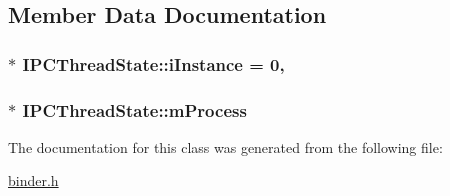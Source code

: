 \subsection{Member Data Documentation}
\hypertarget{classIPCThreadState_a54fefc86880e0e140d40e9aa7247cc47}{
\subsubsection[{i\-Instance}]{ $\ast$ I\-P\-C\-Thread\-State\-::i\-Instance = 0\hspace{0.3cm}{\ttfamily [static]}, {\ttfamily [private]}}}\label{classIPCThreadState_a54fefc86880e0e140d40e9aa7247cc47}
\hypertarget{classIPCThreadState_aefae3c0f96244ce87f9289defee13b54}{
\subsubsection[{m\-Process}]{$\ast$ I\-P\-C\-Thread\-State\-::m\-Process\hspace{0.3cm}{\ttfamily [private]}}}\label{classIPCThreadState_aefae3c0f96244ce87f9289defee13b54}


The documentation for this class was generated from the following file\-:\begin{DoxyCompactItemize}
\item 
\hyperlink{binder_8h}{binder.\-h}\end{DoxyCompactItemize}

